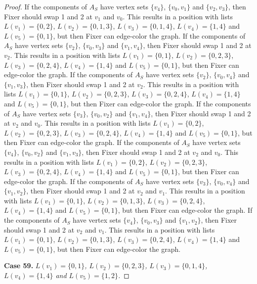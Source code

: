 \documentclass[12pt]{amsart}
\theoremstyle{plain}
\theoremstyle{definition}
\theoremstyle{remark}
\begin{document}
\begin{proof}
If the components of $A_S$ have vertex sets $\{v_4\}$, $\{v_0, v_1\}$ and $\{v_2, v_3\}$, then Fixer should swap 1 and 2 at $v_1$ and $v_0$. This results in a position with lists $L(v_1) = \{0, 2\}$, $L(v_2) = \{0, 1, 3\}$, $L(v_3) = \{0, 1, 4\}$, $L(v_4) = \{1, 4\}$ and $L(v_5) = \{0, 1\}$, but then Fixer can edge-color the graph.
If the components of $A_S$ have vertex sets $\{v_2\}$, $\{v_0, v_3\}$ and $\{v_1, v_4\}$, then Fixer should swap 1 and 2 at $v_2$. This results in a position with lists $L(v_1) = \{0, 1\}$, $L(v_2) = \{0, 2, 3\}$, $L(v_3) = \{0, 2, 4\}$, $L(v_4) = \{1, 4\}$ and $L(v_5) = \{0, 1\}$, but then Fixer can edge-color the graph.
If the components of $A_S$ have vertex sets $\{v_2\}$, $\{v_0, v_4\}$ and $\{v_1, v_3\}$, then Fixer should swap 1 and 2 at $v_2$. This results in a position with lists $L(v_1) = \{0, 1\}$, $L(v_2) = \{0, 2, 3\}$, $L(v_3) = \{0, 2, 4\}$, $L(v_4) = \{1, 4\}$ and $L(v_5) = \{0, 1\}$, but then Fixer can edge-color the graph.
If the components of $A_S$ have vertex sets $\{v_3\}$, $\{v_0, v_2\}$ and $\{v_1, v_4\}$, then Fixer should swap 1 and 2 at $v_2$ and $v_0$. This results in a position with lists $L(v_1) = \{0, 2\}$, $L(v_2) = \{0, 2, 3\}$, $L(v_3) = \{0, 2, 4\}$, $L(v_4) = \{1, 4\}$ and $L(v_5) = \{0, 1\}$, but then Fixer can edge-color the graph.
If the components of $A_S$ have vertex sets $\{v_4\}$, $\{v_0, v_2\}$ and $\{v_1, v_3\}$, then Fixer should swap 1 and 2 at $v_2$ and $v_0$. This results in a position with lists $L(v_1) = \{0, 2\}$, $L(v_2) = \{0, 2, 3\}$, $L(v_3) = \{0, 2, 4\}$, $L(v_4) = \{1, 4\}$ and $L(v_5) = \{0, 1\}$, but then Fixer can edge-color the graph.
If the components of $A_S$ have vertex sets $\{v_3\}$, $\{v_0, v_4\}$ and $\{v_1, v_2\}$, then Fixer should swap 1 and 2 at $v_2$ and $v_1$. This results in a position with lists $L(v_1) = \{0, 1\}$, $L(v_2) = \{0, 1, 3\}$, $L(v_3) = \{0, 2, 4\}$, $L(v_4) = \{1, 4\}$ and $L(v_5) = \{0, 1\}$, but then Fixer can edge-color the graph.
If the components of $A_S$ have vertex sets $\{v_4\}$, $\{v_0, v_3\}$ and $\{v_1, v_2\}$, then Fixer should swap 1 and 2 at $v_2$ and $v_1$. This results in a position with lists $L(v_1) = \{0, 1\}$, $L(v_2) = \{0, 1, 3\}$, $L(v_3) = \{0, 2, 4\}$, $L(v_4) = \{1, 4\}$ and $L(v_5) = \{0, 1\}$, but then Fixer can edge-color the graph.

\noindent\textbf{Case 59.  }\textit{$L(v_1) = \{0, 1\}$, $L(v_2) = \{0, 2, 3\}$, $L(v_3) = \{0, 1, 4\}$, $L(v_4) = \{1, 4\}$ and $L(v_5) = \{1, 2\}$.}


\end{proof}
\end{document}
